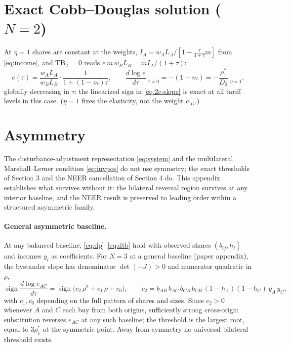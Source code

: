 \documentclass[11pt]{article}
\begin{document}
\appendix

\section{Exact Cobb--Douglas solution ($N = 2$)}

At $\eta = 1$ shares are constant at the weights, $I_A = w_A L_A/[1 - \tfrac{\tau}{1+\tau}m]$ from \eqref{eq:income}, and $\mathrm{TB}_A = 0$ reads $e\, m\, w_B L_B = m I_A/(1+\tau)$:
\begin{equation}
e(\tau) = \frac{w_A L_A}{w_B L_B}\cdot \frac{1}{1 + (1-m)\tau},
\qquad
\frac{d\log e}{d\tau}\bigg|_{\tau=0} = -(1-m) = -\frac{\rho_1^*}{D_2}\bigg|_{\eta=1} ,
\label{eq:2c-exact}
\end{equation}
globally decreasing in $\tau$: the linearized sign in \eqref{eq:2c-slope} is exact at all tariff levels in this case. ($\eta = 1$ fixes the elasticity, not the weight $\alpha_D$.)

\section{Asymmetry}

The disturbance-adjustment representation \eqref{eq:system} and the multilateral Marshall--Lerner condition \eqref{eq:invpos} do not use symmetry; the exact thresholds of Section 3 and the NEER cancellation of Section 4 do. This appendix establishes what survives without it: the bilateral reversal region survives at any interior baseline, and the NEER result is preserved to leading order within a structured asymmetric family.

\paragraph{General asymmetric baseline.} At any balanced baseline, \eqref{eq:dp}--\eqref{eq:dtb} hold with observed shares $(b_{ij}, h_i)$ and incomes $y_i$ as coefficients. For $N = 3$ at a general baseline (paper appendix), the bystander slope has denominator $\det(-J) > 0$ and numerator quadratic in $\rho$,
\begin{equation}
\operatorname{sign} \frac{d\log e_{AC}}{d\tau}
= \operatorname{sign}\big( c_2\, \rho^2 + c_1\, \rho + c_0 \big),
\qquad
c_2 = b_{AB}\, b_{AC}\, b_{CA}\, b_{CB}\, (1-h_A)(1-h_C)\, y_A\, y_C ,
\label{eq:asym-quad}
\end{equation}
with $c_1, c_0$ depending on the full pattern of shares and sizes. Since $c_2 > 0$ whenever $A$ and $C$ each buy from both origins, sufficiently strong cross-origin substitution reverses $e_{AC}$ at any such baseline; the threshold is the largest root, equal to $3\rho_1^*$ at the symmetric point. Away from symmetry no universal bilateral threshold exists.
\end{document}
